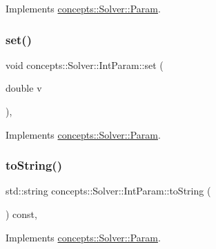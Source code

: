 Implements \hyperlink{classconcepts_1_1_solver_1_1_param_ad3de8144a70e67eeae4278f534e46274}{concepts\+::\+Solver\+::\+Param}.

\mbox{\label{classconcepts_1_1_solver_1_1_int_param_aa678f7356cd371ac1bc11e86e0109ae7}} 
\subsubsection{\texorpdfstring{set()}{set()}\hspace{0.1cm}{\footnotesize\ttfamily [3/3]}}
{\footnotesize\ttfamily void concepts\+::\+Solver\+::\+Int\+Param\+::set (\begin{DoxyParamCaption}\item[{double}]{v }\end{DoxyParamCaption})\hspace{0.3cm}{\ttfamily [inline]}, {\ttfamily [virtual]}}



Implements \hyperlink{classconcepts_1_1_solver_1_1_param_a35b7155d8f6db1b3e63e60b883beebcb}{concepts\+::\+Solver\+::\+Param}.

\mbox{\label{classconcepts_1_1_solver_1_1_int_param_a84740f9d96205d4b7fbc1e011a82e08b}} 
\subsubsection{\texorpdfstring{to\+String()}{toString()}}
{\footnotesize\ttfamily std\+::string concepts\+::\+Solver\+::\+Int\+Param\+::to\+String (\begin{DoxyParamCaption}{ }\end{DoxyParamCaption}) const\hspace{0.3cm}{\ttfamily [inline]}, {\ttfamily [virtual]}}



Implements \hyperlink{classconcepts_1_1_solver_1_1_param_abcbd9c68852499c7be9ebf6a2d22f4b5}{concepts\+::\+Solver\+::\+Param}.



